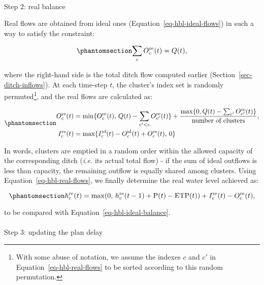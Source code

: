 \documentclass[
  letterpaper,
  DIV=11,
  numbers=noendperiod]{scrreprt}
\makeatletter
\let\oldparagraph\paragraph
\renewcommand{\paragraph}{
    \@ifstar
      \xxxParagraphStar
      \xxxParagraphNoStar
  }
\newcommand{\xxxParagraphStar}[1]{\oldparagraph*{#1}\mbox{}}
\newcommand{\xxxParagraphNoStar}[1]{\oldparagraph{#1}\mbox{}}
\makeatother
\begin{document}
\paragraph{Step 2: real balance}\label{step-2-real-balance}

Real flows are obtained from ideal ones
(Equation~\ref{eq-hbl-ideal-flows}) in such a way to satisfy the
constraint:

\begin{equation}\phantomsection\label{eq-hbl-outflow-sum-constraint}{
\sum _c O_c ^\text{re}(t) = Q(t),
}\end{equation}

where the right-hand side is the total ditch flow computed earlier
(Section~\ref{sec-ditch-inflows}). At each time-step \(t\), the
cluster's index set is randomly permuted\footnote{With some abuse of
  notation, we assume the indexes \(c\) and \(c'\) in
  Equation~\ref{eq-hbl-real-flows} to be sorted according to this random
  permutation.}, and the real flows are calculated as:

\begin{equation}\phantomsection\label{eq-hbl-real-flows}{
\begin{split}
O_c ^\text{re}(t) &= \min \lbrace O_c ^\text{re}(t),\,Q(t)-\sum_{c'<c}O_{c'} ^\text{re}(t) \rbrace +
\dfrac{\max \lbrace 0, Q(t)-\sum_{c'}O_{c'} ^\text{re}(t)\rbrace}{\text{number of clusters}},\\
I_c ^\text{re}(t) &= \max\lbrace I_c ^\text{id}(t)-O_c ^\text{id}(t) + O_c ^\text{re}(t),\,0 \rbrace
\end{split}
}\end{equation}

In words, clusters are emptied in a random order within the allowed
capacity of the corresponding ditch (\emph{i.e.} its actual total flow)
- if the sum of ideal outflows is less than capacity, the remaining
outflow is equally shared among clusters. Using
Equation~\ref{eq-hbl-real-flows}, we finally determine the real water
level achieved as:

\begin{equation}\phantomsection\label{eq-hbl-real-balance}{
h_c^\text{re}(t) = \max(0,\,h_c^\text{re}(t-1)+\text{P}(t)-\text{ETP}(t)) + I_c ^\text{re}(t)-O_c ^\text{re}(t),
}\end{equation}

to be compared with Equation~\ref{eq-hbl-ideal-balance}.

\paragraph{Step 3: updating the plan
delay}\label{step-3-updating-the-plan-delay}
\end{document}
